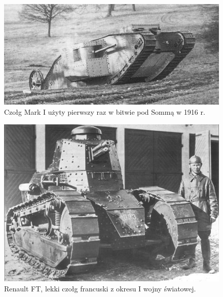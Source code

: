   \begin{figure}[H]
    \begin{center}
\includegraphics[scale=1.5]{imgs/ws_czolg.jpg}
 \caption[Czołg \textit{Mark I}]{\small{Czołg Mark I użyty pierwszy raz w bitwie pod Sommą w 1916 r.}\footnotemark}
        \label{czolg_ws}
    \end{center}
  \end{figure}

  \begin{figure}[H]
    \begin{center}
\includegraphics[scale=1.5]{imgs/ft17.jpg}
 \caption[Czołg \textit{Renault FT}]{\small{Renault FT, lekki czołg francuski z okresu I wojny światowej.}\footnotemark}
        \label{czolg_ft}
    \end{center}
  \end{figure}


